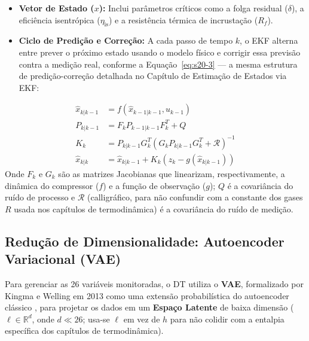 \documentclass[12pt,a4paper]{article}
\numberwithin{equation}{section}
\numberwithin{table}{section}
\numberwithin{figure}{section}
\begin{document}
	\begin{itemize}
		\item \textbf{Vetor de Estado ($x$):} Inclui parâmetros críticos como a folga residual ($\delta$), a eficiência isentrópica ($\eta_{\text{is}}$) e a resistência térmica de incrustação ($R_f$).
		\item \textbf{Ciclo de Predição e Correção:} A cada passo de tempo $k$, o EKF alterna entre prever o próximo estado usando o modelo físico e corrigir essa previsão contra a medição real, conforme a Equação~\eqref{eq:s20-3} — a mesma estrutura de predição-correção detalhada no Capítulo de Estimação de Estados via EKF:
	\end{itemize}
	\begin{equation}\label{eq:s20-3}
	\begin{aligned}
		\hat{x}_{k|k-1} &= f(\hat{x}_{k-1|k-1}, u_{k-1}) \\[4pt]
		P_{k|k-1} &= F_k P_{k-1|k-1} F_k^T + Q \\[4pt]
		K_k &= P_{k|k-1} G_k^T (G_k P_{k|k-1} G_k^T + \mathcal{R})^{-1} \\[4pt]
		\hat{x}_{k|k} &= \hat{x}_{k|k-1} + K_k (z_k - g(\hat{x}_{k|k-1}))
	\end{aligned}
\end{equation}
	Onde $F_k$ e $G_k$ são as matrizes Jacobianas que linearizam, respectivamente, a dinâmica do compressor ($f$) e a função de observação ($g$); $Q$ é a covariância do ruído de processo e $\mathcal{R}$ (calligráfico, para não confundir com a constante dos gases $R$ usada nos capítulos de termodinâmica) é a covariância do ruído de medição.

	\subsection{Redução de Dimensionalidade: Autoencoder Variacional (VAE)}

	Para gerenciar as 26 variáveis monitoradas, o DT utiliza o \textbf{VAE}, formalizado por Kingma e Welling em 2013 como uma extensão probabilística do autoencoder clássico \cite{vae}, para projetar os dados em um \textbf{Espaço Latente} de baixa dimensão ($\ell \in \mathbb{R}^d$, onde $d \ll 26$; usa-se $\ell$ em vez de $h$ para não colidir com a entalpia específica dos capítulos de termodinâmica).
	
\end{document}
